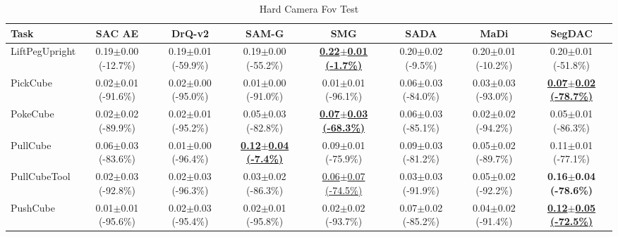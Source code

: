 \begin{table}[htbp]
\centering
\scriptsize
\caption{Hard Camera Fov Test}
\label{tab:appendix_camerafovtest_hard}
\begin{adjustbox}{max width=\textwidth}
\begin{tabular}{l*{7}{c}}
\toprule
\textbf{Task} & \textbf{SAC AE} & \textbf{DrQ-v2} & \textbf{SAM-G} & \textbf{SMG} & \textbf{SADA} & \textbf{MaDi} & \textbf{SegDAC} \\
\midrule
LiftPegUpright & 0.19$\pm$0.00 \scriptsize{(-12.7\%)} & 0.19$\pm$0.01 \scriptsize{(-59.9\%)} & 0.19$\pm$0.00 \scriptsize{(-55.2\%)} & \textbf{\underline{0.22$\pm$0.01 \scriptsize{(-1.7\%)}}} & 0.20$\pm$0.02 \scriptsize{(-9.5\%)} & 0.20$\pm$0.01 \scriptsize{(-10.2\%)} & 0.20$\pm$0.01 \scriptsize{(-51.8\%)} \\
PickCube & 0.02$\pm$0.01 \scriptsize{(-91.6\%)} & 0.02$\pm$0.00 \scriptsize{(-95.0\%)} & 0.01$\pm$0.00 \scriptsize{(-91.0\%)} & 0.01$\pm$0.01 \scriptsize{(-96.1\%)} & 0.06$\pm$0.03 \scriptsize{(-84.0\%)} & 0.03$\pm$0.03 \scriptsize{(-93.0\%)} & \textbf{\underline{0.07$\pm$0.02 \scriptsize{(-78.7\%)}}} \\
PokeCube & 0.02$\pm$0.02 \scriptsize{(-89.9\%)} & 0.02$\pm$0.01 \scriptsize{(-95.2\%)} & 0.05$\pm$0.03 \scriptsize{(-82.8\%)} & \textbf{\underline{0.07$\pm$0.03 \scriptsize{(-68.3\%)}}} & 0.06$\pm$0.03 \scriptsize{(-85.1\%)} & 0.02$\pm$0.02 \scriptsize{(-94.2\%)} & 0.05$\pm$0.01 \scriptsize{(-86.3\%)} \\
PullCube & 0.06$\pm$0.03 \scriptsize{(-83.6\%)} & 0.01$\pm$0.00 \scriptsize{(-96.4\%)} & \textbf{\underline{0.12$\pm$0.04 \scriptsize{(-7.4\%)}}} & 0.09$\pm$0.01 \scriptsize{(-75.9\%)} & 0.09$\pm$0.03 \scriptsize{(-81.2\%)} & 0.05$\pm$0.02 \scriptsize{(-89.7\%)} & 0.11$\pm$0.01 \scriptsize{(-77.1\%)} \\
PullCubeTool & 0.02$\pm$0.03 \scriptsize{(-92.8\%)} & 0.02$\pm$0.03 \scriptsize{(-96.3\%)} & 0.03$\pm$0.02 \scriptsize{(-86.3\%)} & \underline{0.06$\pm$0.07 \scriptsize{(-74.5\%)}} & 0.03$\pm$0.03 \scriptsize{(-91.9\%)} & 0.05$\pm$0.02 \scriptsize{(-92.2\%)} & \textbf{0.16$\pm$0.04 \scriptsize{(-78.6\%)}} \\
PushCube & 0.01$\pm$0.01 \scriptsize{(-95.6\%)} & 0.02$\pm$0.03 \scriptsize{(-95.4\%)} & 0.02$\pm$0.01 \scriptsize{(-95.8\%)} & 0.02$\pm$0.02 \scriptsize{(-93.7\%)} & 0.07$\pm$0.02 \scriptsize{(-85.2\%)} & 0.04$\pm$0.02 \scriptsize{(-91.4\%)} & \textbf{\underline{0.12$\pm$0.05 \scriptsize{(-72.5\%)}}} \\

\end{tabular}
\end{adjustbox}
\end{table}
